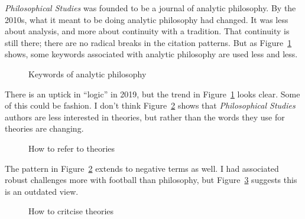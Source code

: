 \documentclass[
  10pt,
  letterpaper,
  DIV=11,
  numbers=noendperiod,
  twoside]{scrartcl}
\begin{document}
\emph{Philosophical Studies} was founded to be a journal of analytic
philosophy. By the 2010s, what it meant to be doing analytic philosophy
had changed. It was less about analysis, and more about continuity with
a tradition. That continuity is still there; there are no radical breaks
in the citation patterns. But as Figure~\ref{fig-analytic-words} shows,
some keywords associated with analytic philosophy are used less and
less.

\begin{figure}


\caption{\label{fig-analytic-words}Keywords of analytic philosophy}

\end{figure}%

There is an uptick in ``logic'' in 2019, but the trend in
Figure~\ref{fig-analytic-words} looks clear. Some of this could be
fashion. I don't think Figure~\ref{fig-theory-words} shows that
\emph{Philosophical Studies} authors are less interested in theories,
but rather than the words they use for theories are changing.

\begin{figure}


\caption{\label{fig-theory-words}How to refer to theories}

\end{figure}%

The pattern in Figure~\ref{fig-theory-words} extends to negative terms
as well. I had associated robust challenges more with football than
philosophy, but Figure~\ref{fig-objection-words} suggests this is an
outdated view.

\begin{figure}


\caption{\label{fig-objection-words}How to critcise theories}

\end{figure}%
\end{document}
